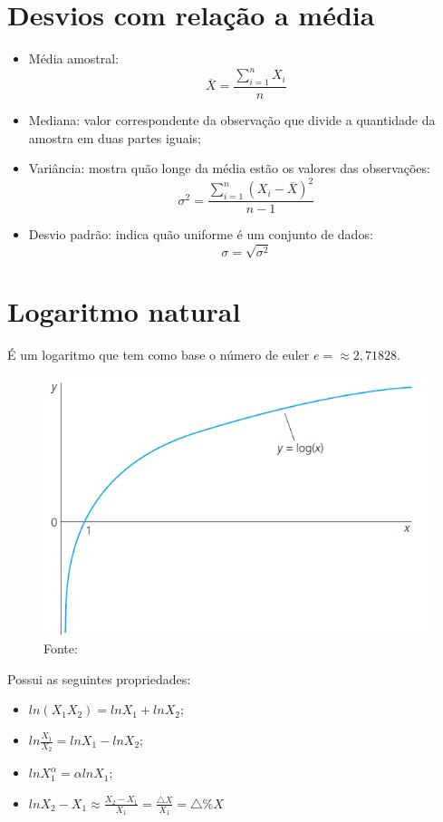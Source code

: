 \documentclass[12pt,a4paper,oneside,brazil]{abntex2}
\begin{document}
 \section{Desvios com relação a média}
 \begin{itemize}
 \item Média amostral:
\[ \overline{X} = \frac{\sum_{i=1}^{n} X_i}{n}\]
\item Mediana: valor correspondente da observação que divide a quantidade da amostra em duas partes iguais;
\item Variância: mostra quão longe da média estão os valores das observações:
\[ \sigma^2 = \frac{\sum_{i=1}^{n} (X_i - \overline{X})^2}{n-1} \]
\item Desvio padrão: indica quão uniforme é um conjunto de dados:
\[ \sigma = \sqrt{\sigma^2} \]
 \end{itemize}
 
\section{Logaritmo natural}
É um logaritmo que tem como base o número de euler $e = \approx 2,71828$.

\begin{figure}[h]
\includegraphics[scale=0.7]{logaritmo natural.png}
\centering
\caption{Fonte: \cite[p. 637]{wooldridge}}
\end{figure}

 Possui as seguintes propriedades:
\begin{itemize}
\item $ln (X_1 X_2) = ln X_1 + ln X_2 $;
\item  $ln \frac{X_1}{X_2} = ln X_1 - ln X_2$;
\item  $ln X_1^{\alpha } = \alpha ln X_1$;
\item $ ln X_2 - X_1 \approx \frac{X_2 - X_1}{X_1} = \frac{\triangle X}{X_1} = \triangle \% X $
\end{itemize}
\end{document}
